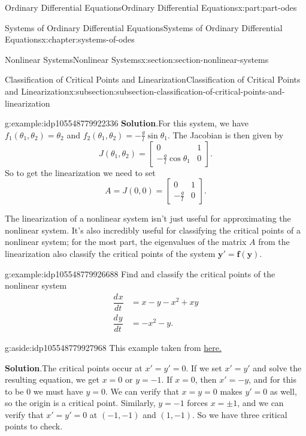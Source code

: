 \documentclass[oneside,10pt,]{book}
\newcommand{\blocktitlefont}{\relax}
\numberwithin{equation}{part}
\renewcommand{\vec}[1]{\mathbf{#1}}
\newcommand{\dv}[3][]{\dfrac{d^{#1} #2}{d #3^{#1}}}
\newcommand{\amp}{&}
\begin{document}
\begin{partptx}{Ordinary Differential Equations}{}{Ordinary Differential Equations}{}{}{x:part:part-odes}
\begin{chapterptx}{Systems of Ordinary Differential Equations}{}{Systems of Ordinary Differential Equations}{}{}{x:chapter:systems-of-odes}
\begin{sectionptx}{Nonlinear Systems}{}{Nonlinear Systems}{}{}{x:section:section-nonlinear-systems}
\begin{subsectionptx}{Classification of Critical Points and Linearization}{}{Classification of Critical Points and Linearization}{}{}{x:subsection:subsection-classification-of-critical-points-and-linearization}
\begin{example}{}{g:example:idp105548779922336}
\noindent\textbf{\blocktitlefont Solution}.\hypertarget{g:solution:idp105548779923616}{}\quad{}For this system, we have \(f_{1}(\theta_{1},\theta_{2}) = \theta_{2}\) and \(f_{2}(\theta_{1},\theta_{2}) = -\frac{g}{l}\sin\theta_{1}\). The Jacobian is then given by%
\begin{equation*}
J(\theta_{1},\theta_{2}) = \begin{bmatrix}0 \amp  1 \\ -\frac{g}{l}\cos\theta_{1} \amp  0\end{bmatrix}.
\end{equation*}
So to get the linearization we need to set%
\begin{equation*}
A = J(0,0) = \begin{bmatrix}0 \amp  1 \\ -\frac{g}{l} \amp  0\end{bmatrix}.
\end{equation*}
%
\end{example}
The linearization of a nonlinear system isn't just useful for approximating the nonlinear system. It's also incredibly useful for classifying the critical points of a nonlinear system; for the most part, the eigenvalues of the matrix \(A\) from the linearization also classify the critical points of the system \(\vec{y}' = \vec{f}(\vec{y})\).%
\begin{example}{}{g:example:idp105548779926688}%
Find and classify the critical points of the nonlinear system%
\begin{align*}
\dv{x}{t} \amp = x - y - x^{2} + xy \\
\dv{y}{t} \amp = -x^{2} - y \text{.}
\end{align*}
%
\begin{aside}{}{g:aside:idp105548779927968}%
This example taken from \href{https://www.math.uci.edu/\~ndonalds/math3d/nonlinear.pdf}{here.}\footnotemark{}%
\end{aside}
\par\smallskip%
\noindent\textbf{\blocktitlefont Solution}.\hypertarget{g:solution:idp105548779929120}{}\quad{}The critical points occur at \(x' = y' = 0\). If we set \(x' = y'\) and solve the resulting equation, we get \(x = 0\) or \(y = -1\). If \(x = 0\), then \(x' = -y\), and for this to be \(0\) we must have \(y = 0\). We can verify that \(x = y = 0\) makes \(y' = 0\) as well, so the origin is a critical point. Similarly, \(y = -1\) forces \(x = \pm1\), and we can verify that \(x' = y' = 0\) at \((-1,-1)\) and \((1,-1)\). So we have three critical points to check.%

\end{example}
\end{subsectionptx}
\end{sectionptx}
\end{chapterptx}
\end{partptx}
\end{document}
